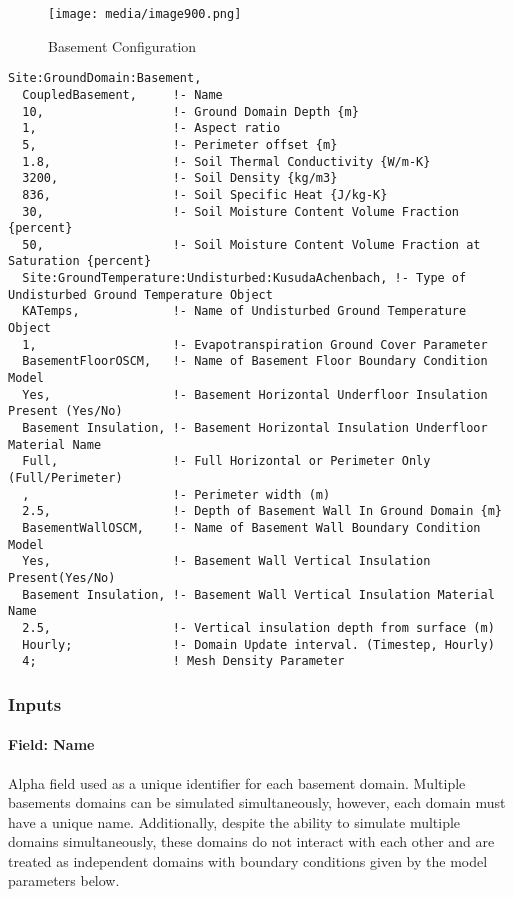 \begin{figure}[htbp]
\centering
\texttt{[image: media/image900.png]}
\caption{Basement Configuration \protect \label{fig:basement-configuration}}
\end{figure}

\begin{lstlisting}
Site:GroundDomain:Basement,
  CoupledBasement,     !- Name
  10,                  !- Ground Domain Depth {m}
  1,                   !- Aspect ratio
  5,                   !- Perimeter offset {m}
  1.8,                 !- Soil Thermal Conductivity {W/m-K}
  3200,                !- Soil Density {kg/m3}
  836,                 !- Soil Specific Heat {J/kg-K}
  30,                  !- Soil Moisture Content Volume Fraction {percent}
  50,                  !- Soil Moisture Content Volume Fraction at Saturation {percent}
  Site:GroundTemperature:Undisturbed:KusudaAchenbach, !- Type of Undisturbed Ground Temperature Object
  KATemps,             !- Name of Undisturbed Ground Temperature Object
  1,                   !- Evapotranspiration Ground Cover Parameter
  BasementFloorOSCM,   !- Name of Basement Floor Boundary Condition Model
  Yes,                 !- Basement Horizontal Underfloor Insulation Present (Yes/No)
  Basement Insulation, !- Basement Horizontal Insulation Underfloor Material Name
  Full,                !- Full Horizontal or Perimeter Only (Full/Perimeter)
  ,                    !- Perimeter width (m)
  2.5,                 !- Depth of Basement Wall In Ground Domain {m}
  BasementWallOSCM,    !- Name of Basement Wall Boundary Condition Model
  Yes,                 !- Basement Wall Vertical Insulation Present(Yes/No)
  Basement Insulation, !- Basement Wall Vertical Insulation Material Name
  2.5,                 !- Vertical insulation depth from surface (m)
  Hourly;              !- Domain Update interval. (Timestep, Hourly)
  4;                   ! Mesh Density Parameter
\end{lstlisting}

\subsubsection{Inputs}\label{inputs-17-004}

\paragraph{Field: Name}\label{field-name-9-009}

Alpha field used as a unique identifier for each basement domain. Multiple basements domains can be simulated simultaneously, however, each domain must have a unique name. Additionally, despite the ability to simulate multiple domains simultaneously, these domains do not interact with each other and are treated as independent domains with boundary conditions given by the model parameters below.

